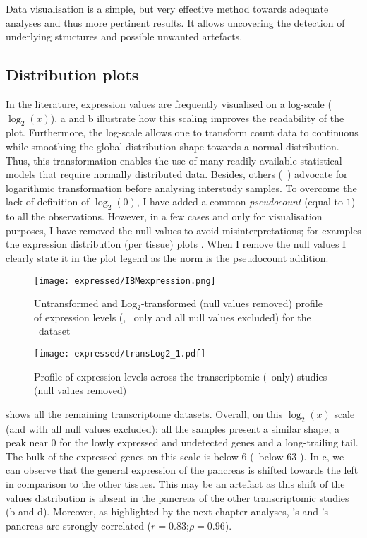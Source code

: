 Data visualisation is a simple, but very effective method
towards adequate analyses and thus more pertinent results.
It allows uncovering the detection of underlying structures
and possible unwanted artefacts.

\subsection{Distribution plots}\label{subsec:distribPlot}
\vspace{-0.2in}
In the literature, expression values are frequently
visualised on a log-scale ($\log_{2}(x)$).
a and b illustrate how
this scaling improves the readability of the plot.
Furthermore, the log-scale allows one to transform count data to continuous
while smoothing the global distribution shape towards a normal distribution.
Thus, this transformation enables
the use of many readily available statistical models
that require normally distributed data.
Besides, others (\eg\ \citet{Danielsson2015-cn}) advocate
for logarithmic transformation before analysing interstudy samples.
To overcome the lack of definition of $\log_{2}(0)$,
I have added a common \emph{pseudocount} (equal to $1$)
to all the observations.
However, in a few cases and only for visualisation purposes,
I have removed the null values to avoid misinterpretations;
for examples the expression distribution (per tissue) plots
.
When I remove the null values I clearly state it in the plot legend
as the norm is the pseudocount addition.

\begin{figure}[!htbp]
    \centering
    \texttt{[image: expressed/IBMexpression.png]}
    \caption{Untransformed and Log$_{2}$-transformed (null values removed) profile
    of expression levels (\FPKM, \pcgs\ only and all null values excluded)
    for the \ibm\ dataset}\label{fig:distribPlot}
\end{figure}

\begin{figure}[!htbp]
    \centering
    \texttt{[image: expressed/transLog2\_1.pdf]}
    \caption{Profile of expression levels across the transcriptomic (\pcgs\ only)
    studies (null values removed)
    }\label{fig:distribTrans}
\end{figure}

 shows all the remaining transcriptome datasets.
Overall,
on this $\log_{2}(x)$ scale (and with all null values excluded):
all the samples present a similar shape;
a peak near $0$ for the lowly expressed and undetected genes and a long-trailing tail.
The bulk of the expressed genes on this scale is below $6$ (\ie\ below 63 \FPKM).
In c, we can observe that the general expression
of the pancreas is shifted towards the left in comparison to the other tissues.
This may be an artefact as this shift of the values distribution
is absent in the pancreas of the other transcriptomic studies
(b and d).
Moreover, as highlighted by the next chapter analyses,
\uhlen's and  \gtex's pancreas are strongly
correlated ($r = 0.83$;$\rho = 0.96$).

